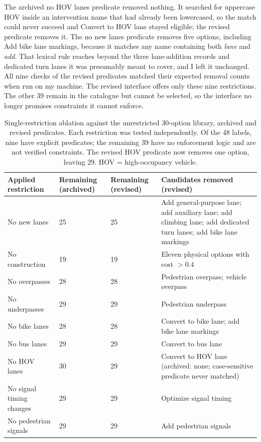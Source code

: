 \documentclass[11pt]{article}
\begin{document}
The archived no HOV lanes predicate removed nothing. It searched for uppercase HOV inside an intervention name that had already been lowercased, so the match could never succeed and Convert to HOV lane stayed eligible; the revised predicate removes it. The no new lanes predicate removes five options, including Add bike lane markings, because it matches any name containing both \emph{lane} and \emph{add}. That lexical rule reaches beyond the three lane-addition records and dedicated turn lanes it was presumably meant to cover, and I left it unchanged. All nine checks of the revised predicates matched their expected removal counts when run on my machine. The revised interface offers only these nine restrictions. The other 39 remain in the catalogue but cannot be selected, so the interface no longer promises constraints it cannot enforce.

\begin{table}[!htbp]
\centering\small
\caption{Single-restriction ablation against the unrestricted 30-option library, archived and revised predicates. Each restriction was tested independently. Of the 48 labels, nine have explicit predicates; the remaining 39 have no enforcement logic and are not verified constraints. The revised HOV predicate now removes one option, leaving 29. HOV = high-occupancy vehicle.}
\label{tab:restrictions}
\begin{tabularx}{\textwidth}{P{0.20\textwidth} P{0.11\textwidth} P{0.11\textwidth} Y}
\toprule
Applied restriction & Remaining (archived) & Remaining (revised) & Candidates removed (revised) \\
\midrule
No new lanes & 25 & 25 & Add general-purpose lane; add auxiliary lane; add climbing lane; add dedicated turn lanes; add bike lane markings \\
No construction & 19 & 19 & Eleven physical options with cost $>0.4$ \\
No overpasses & 28 & 28 & Pedestrian overpass; vehicle overpass \\
No underpasses & 29 & 29 & Pedestrian underpass \\
No bike lanes & 28 & 28 & Convert to bike lane; add bike lane markings \\
No bus lanes & 29 & 29 & Convert to bus lane \\
No HOV lanes & 30 & 29 & Convert to HOV lane (archived: none; case-sensitive predicate never matched) \\
No signal timing changes & 29 & 29 & Optimize signal timing \\
No pedestrian signals & 29 & 29 & Add pedestrian signals \\
\bottomrule
\end{tabularx}
\end{table}
\end{document}
